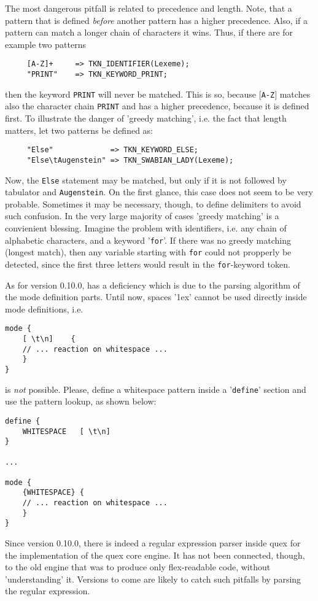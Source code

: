 The most dangerous pitfall is related to precedence and length. Note, that a 
pattern that is defined {\it before} another pattern has a higher
precedence. Also, if a pattern can match a longer chain of characters it wins.
Thus, if there are for example two patterns

\begin{verbatim}
     [A-Z]+     => TKN_IDENTIFIER(Lexeme);
     "PRINT"    => TKN_KEYWORD_PRINT;
\end{verbatim}

then the keyword {\tt PRINT} will never be matched. This is so, because
$[${\tt A-Z}$]$ matches also the character chain {\tt PRINT} and has
a higher precedence, because it is defined first. To illustrate the
danger of 'greedy matching', i.e. the fact that length matters, let
two patterns be defined as:

\begin{verbatim}
     "Else"             => TKN_KEYWORD_ELSE;
     "Else\tAugenstein" => TKN_SWABIAN_LADY(Lexeme);
\end{verbatim}
Now, the {\tt Else} statement may be matched, but only if it is not
followed by tabulator and {\tt Augenstein}. On the first glance, this
case does not seem to be very probable. Sometimes it may be necessary,
     though, to define delimiters to avoid such confusion. In the very large majority of
     cases 'greedy matching' is a convienient blessing. Imagine the problem with 
     identifiers, i.e. any chain of alphabetic characters, and a keyword '{\tt for}'.
     If there was no greedy matching (longest match), then any variable starting
     with {\tt for} could not propperly be detected, since the first three letters
     would result in the {\tt for}-keyword token.

As for version 0.10.0, {\quex} has a deficiency which is due to the parsing algorithm
of the mode definition parts. Until now, spaces '\kern 1ex' cannot be used directly
inside mode definitions, i.e.

\begin{verbatim}
mode {
    [ \t\n]    {
	// ... reaction on whitespace ...
    }
}
\end{verbatim}

is {\it not} possible. Please, define a whitespace pattern inside a '{\tt define}' section
and use the pattern lookup, as shown below:

\begin{verbatim}
define {
    WHITESPACE   [ \t\n]
}

...

mode {
    {WHITESPACE} {
	// ... reaction on whitespace ...
    }
}
\end{verbatim}

Since version 0.10.0, there is indeed a regular expression parser inside quex
for the implementation of the quex core engine. It has not been connected,
though, to the old engine that was to produce only flex-readable code,
without 'understanding' it.  Versions to come are likely to catch such pitfalls by
parsing the regular expression.

